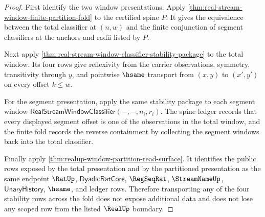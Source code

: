 \begin{proof}
First identify the two window presentations. Apply
\autoref{thm:real-stream-window-finite-partition-fold} to the certified spine
$P$. It gives the equivalence between the total classifier at $(n,w)$ and the
finite conjunction of segment classifiers at the anchors and radii listed by
$P$.

Next apply \autoref{thm:real-stream-window-classifier-stability-package} to the
total window. Its four rows give reflexivity from the carrier observations,
symmetry, transitivity through $y$, and pointwise $\hsame$ transport from
$(x,y)$ to $(x',y')$ on every offset $k\le w$.

For the segment presentation, apply the same stability package to each segment
window $\mathsf{RealStreamWindowClassifier}(-,-,n_i,r_i)$. The spine ledger
records that every displayed segment offset is one of the observations in the
total window, and the finite fold records the reverse containment by collecting
the segment windows back into the total classifier.

Finally apply \autoref{thm:realup-window-partition-read-surface}. It identifies
the public rows exposed by the total presentation and by the partitioned
presentation as the same endpoint $\RatUp$, $\mathsf{DyadicRatCore}$,
$\RegSeqRat$, $\StreamNameUp$, $\mathsf{UnaryHistory}$, $\hsame$, and ledger
rows. Therefore transporting any of the four stability rows across the fold
does not expose additional data and does not lose any scoped row from the
listed $\RealUp$ boundary.
\end{proof}

